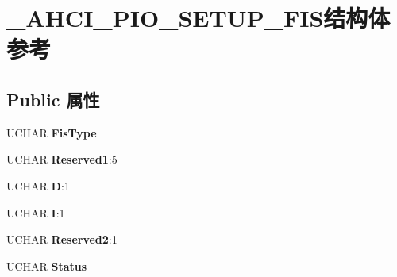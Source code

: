 \hypertarget{struct___a_h_c_i___p_i_o___s_e_t_u_p___f_i_s}{}\section{\+\_\+\+A\+H\+C\+I\+\_\+\+P\+I\+O\+\_\+\+S\+E\+T\+U\+P\+\_\+\+F\+I\+S结构体 参考}
\label{struct___a_h_c_i___p_i_o___s_e_t_u_p___f_i_s}
\subsection*{Public 属性}
\begin{DoxyCompactItemize}
\item 
\mbox{\label{struct___a_h_c_i___p_i_o___s_e_t_u_p___f_i_s_af162a59bc414c3385b52cc71e3ac696c}} 
U\+C\+H\+AR {\bfseries Fis\+Type}
\item 
\mbox{\label{struct___a_h_c_i___p_i_o___s_e_t_u_p___f_i_s_ac7bf53f67b7622006495105f5c97f362}} 
U\+C\+H\+AR {\bfseries Reserved1}\+:5
\item 
\mbox{\label{struct___a_h_c_i___p_i_o___s_e_t_u_p___f_i_s_a07ad892dc022c30f865909545efd71b2}} 
U\+C\+H\+AR {\bfseries D}\+:1
\item 
\mbox{\label{struct___a_h_c_i___p_i_o___s_e_t_u_p___f_i_s_a59bd8a5acf5ece7bfbb647835bfb713a}} 
U\+C\+H\+AR {\bfseries I}\+:1
\item 
\mbox{\label{struct___a_h_c_i___p_i_o___s_e_t_u_p___f_i_s_a6f92e3c55d564add38dfbfdd6a1f0d04}} 
U\+C\+H\+AR {\bfseries Reserved2}\+:1
\item 
\mbox{\label{struct___a_h_c_i___p_i_o___s_e_t_u_p___f_i_s_a93705448abcb8b942b567a4018e7b6a5}} 
U\+C\+H\+AR {\bfseries Status}
\item 
\mbox{\label{struct___a_h_c_i___p_i_o___s_e_t_u_p___f_i_s_a809f84b58aa744d656a2c7c09a34b01f}} 

\end{DoxyCompactItemize}
